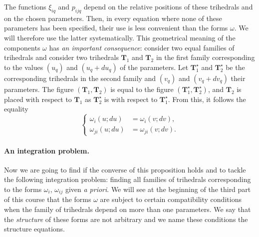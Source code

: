 \documentclass[leqno,11pt]{book}
\numberwithin{equation}{chapter}
\theoremstyle{shape1}
\theoremstyle{shapesmall}
\begin{document}
The functions $\xi_{iq}$ and $p_{ijq}$ depend on the relative positions of these trihedrals and on the chosen parameters. Then, in every equation where none of these parameters has been specified, their use is less convenient than the forms $\omega$. We will therefore use the latter systematically. This geometrical meaning of the components $\omega$ has \emph{an important consequence}: consider two equal families of trihedrals and consider two trihedrals $\mathbf{T}_{1}$ and $\mathbf{T}_{2}$ in the first family corresponding to the values $(u_{q})$ and $(u_{q}+du_{q})$ of the parameters. Let $\mathbf{T}^{\star}_{1}$ and $\mathbf{T}^{\star}_{2}$ be the corresponding trihedrals in the second family and $(v_{q})$ and $(v_{q}+dv_{q})$ their parameters. The figure $(\mathbf{T}_{1},\mathbf{T}_{2})$ is equal to the figure $(\mathbf{T}^{\star}_{1},\mathbf{T}^{\star}_{2})$, and $\mathbf{T}_{2}$ is placed with respect to $\mathbf{T}_{1}$ as $\mathbf{T}^{\star}_{2}$ is with respect to $\mathbf{T}^{\star}_{1}$. From this, it follows the equality
\begin{equation}
  \label{eq:1.5}
  \left\{
    \begin{aligned}
      \omega_{i}(u;du)&=\omega_{i}(v;dv),\\
      \omega_{ji}(u;du)&=\omega_{ji}(v;dv).
    \end{aligned}
  \right.
\end{equation}

\paragraph{An integration problem.}
\label{sec:5}
Now we are going to find if the converse of this proposition holds and to tackle the following integration problem: finding all families of trihedrals corresponding to the forms $\omega_{i}$, $\omega_{ij}$ given \emph{a priori}. We will see at the beginning of the third part of this course that the forms $\omega$ are subject to certain compatibility conditions when the family of trihedrals depend on more than one parameters. We say that the \emph{structure} of these forms are not arbitrary and we name these conditions the structure equations.
\end{document}
